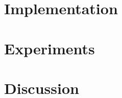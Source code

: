 \documentclass[journal]{vgtc}                %
\begin{document}
\section{Implementation}
\label{sec:implementation}


\section{Experiments}
\label{sec:experiments}


\section{Discussion}
\label{sec:discussion}





\end{document}
